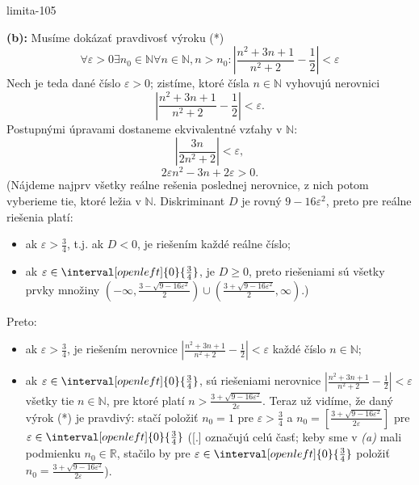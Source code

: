 \begin{defproblem}{limita-105}
\begin{solution}
    \textbf{(b):}
    Musíme dokázať pravdivosť výroku (*)
    \[
        \forall \varepsilon > 0 \exists n_0 \in \mathbb{N} \forall n \in \mathbb{N},
        n>n_0: \left\lvert \frac{n^2+3n+1}{n^2+2}-\frac{1}{2} \right\rvert < \varepsilon
    \]
    Nech je teda dané číslo $\varepsilon > 0$; zistíme, ktoré čísla $n \in
    \mathbb{N}$ vyhovujú nerovnici
    \[
        \left\lvert \frac{n^2 + 3n + 1}{n^2 + 2}-\frac{1}{2} \right\rvert < \varepsilon.
    \]
    Postupnými úpravami dostaneme ekvivalentné vzťahy v $\mathbb{N}:$
    \[
        \left\lvert \frac{3n}{2n^2 + 2} \right\rvert < \varepsilon,
    \]
    \[
        2 \varepsilon n^2 - 3n + 2 \varepsilon >0.
    \]
    (Nájdeme najprv všetky reálne rešenia poslednej nerovnice, z nich potom
    vyberieme tie, ktoré ležia v $\mathbb{N}$. Diskriminant $D$ je rovný $9-16
    \varepsilon^2$, preto pre reálne riešenia platí:
    \begin{itemize}
        \item
            ak $\varepsilon > \frac{3}{4}$, t.j. ak $D<0$, je riešením každé
            reálne číslo;
        \item
            ak $\varepsilon \in \interval[open left]{0}{\frac{3}{4}}$, je $D \geq 0$, preto
            riešeniami sú všetky prvky množiny
            $(-\infty,\frac{3-\sqrt{9-16\varepsilon^2}}{2}) \cup
            (\frac{3+\sqrt{9-16\varepsilon^2}}{2},\infty)$.)
    \end{itemize}
    Preto:
    \begin{itemize}
        \item
            ak $\varepsilon > \frac{3}{4}$, je riešením nerovnice
            $|\frac{n^2 + 3n + 1}{n^2 + 2} - \frac{1}{2}| < \varepsilon$
            každé číslo $n \in \mathbb{N}$;
        \item
            ak $\varepsilon \in \interval[open left]{0}{\frac{3}{4}}$, sú
            riešeniami nerovnice
            $|\frac{n^2 + 3n + 1}{n^2 + 2} - \frac{1}{2}|<\varepsilon$ všetky
            tie $n \in \mathbb{N}$, pre ktoré platí
            $n > \frac{3 + \sqrt{9 - 16\varepsilon^2}}{2\varepsilon}$.
            Teraz už vidíme, že daný výrok (*) je pravdivý: stačí položiť
            $n_0 = 1$ pre $\varepsilon > \frac{3}{4}$ a
            $n_0 = [\frac{3 + \sqrt{9 - 16\varepsilon^2}}{2\varepsilon}]$
            pre
            $\varepsilon \in \interval[open left]{0}{\frac{3}{4}}$
            ([.] označujú celú časť; keby sme v \textit{(a)} mali podmienku
            $n_0 \in \mathbb{R}$, stačilo by pre
            $\varepsilon \in \interval[open left]{0}{\frac{3}{4}}$
            položiť $n_0 = \frac{3 + \sqrt{9 - 16\varepsilon^2}}{2\varepsilon}$).
    \end{itemize}


\end{solution}
\end{defproblem}
